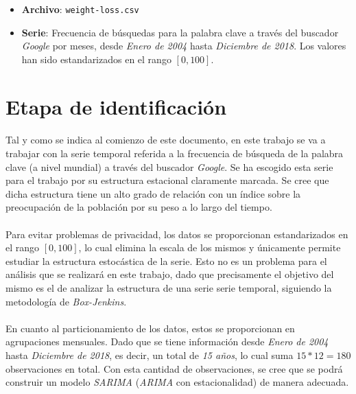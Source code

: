 \documentclass[a4paper, spanish]{article}
\begin{document}
  \maketitle

  \begin{itemize}
    \item \textbf{Archivo}: \texttt{weight-loss.csv}
    \item \textbf{Serie}: Frecuencia de búsquedas para la palabra clave  a través del buscador \emph{Google} por meses, desde \emph{Enero de 2004} hasta \emph{Diciembre de 2018}. Los valores han sido estandarizados en el rango $[0, 100]$.
  \end{itemize}

  \section{Etapa de identificación}
  \label{sec:1}

    \paragraph{}
    Tal y como se indica al comienzo de este documento, en este trabajo se va a trabajar con la serie temporal referida a la frecuencia de búsqueda de la palabra clave  (a nivel mundial) a través del buscador \emph{Google}. Se ha escogido esta serie para el trabajo por su estructura estacional claramente marcada. Se cree que dicha estructura tiene un alto grado de relación con un índice sobre la preocupación de la población por su peso a lo largo del tiempo.

    \paragraph{}
    Para evitar problemas de privacidad, los datos se proporcionan estandarizados en el rango $[0, 100]$, lo cual elimina la escala de los mismos y únicamente permite estudiar la estructura estocástica de la serie. Esto no es un problema para el análisis que se realizará en este trabajo, dado que precisamente el objetivo del mismo es el de analizar la estructura de una serie serie temporal, siguiendo la metodología de \emph{Box-Jenkins}.

    \paragraph{}
    En cuanto al particionamiento de los datos, estos se proporcionan en agrupaciones mensuales. Dado que se tiene información desde \emph{Enero de 2004} hasta \emph{Diciembre de 2018}, es decir, un total de \emph{15 años}, lo cual suma $15 * 12 = 180$ observaciones en total. Con esta cantidad de observaciones, se cree que se podrá construir un modelo \emph{SARIMA} (\emph{ARIMA} con estacionalidad) de manera adecuada.
\end{document}
